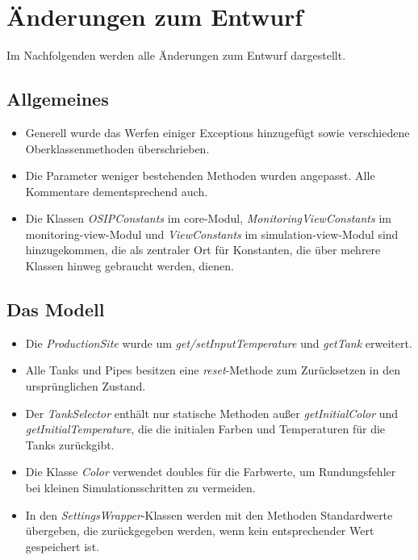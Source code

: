 \documentclass[parskip=full]{scrartcl}
\begin{document}
\section{Änderungen zum Entwurf}
Im Nachfolgenden werden alle Änderungen zum Entwurf dargestellt.

\subsection{Allgemeines}
\begin{itemize}
 \item Generell wurde das Werfen einiger Exceptions hinzugefügt sowie verschiedene Oberklassenmethoden überschrieben.
 \item Die Parameter weniger bestehenden Methoden wurden angepasst. Alle Kommentare dementsprechend auch.
 \item Die Klassen \emph{OSIPConstants} im core-Modul, \emph{MonitoringViewConstants} im monitoring-view-Modul und \emph{ViewConstants} im simulation-view-Modul sind hinzugekommen, die als zentraler Ort für Konstanten, die über mehrere Klassen hinweg gebraucht werden, dienen.
\end{itemize}

\subsection{Das Modell}
\begin{itemize}
 \item Die \emph{ProductionSite} wurde um \emph{get/setInputTemperature} und \emph{getTank} erweitert.
 \item Alle Tanks und Pipes besitzen eine \emph{reset}-Methode zum Zurücksetzen in den ursprünglichen Zustand.
 \item Der \emph{TankSelector} enthält nur statische Methoden außer \emph{getInitialColor} und \emph{getInitialTemperature}, die die initialen Farben und Temperaturen für die Tanks zurückgibt.
 \item Die Klasse \emph{Color} verwendet doubles für die Farbwerte, um Rundungsfehler bei kleinen Simulationsschritten zu vermeiden.
 \item In den \emph{SettingsWrapper}-Klassen werden mit den Methoden Standardwerte übergeben, die zurückgegeben werden, wenn kein entsprechender Wert gespeichert ist.
\end{itemize}
\end{document}
